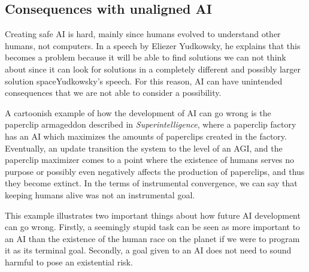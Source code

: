 \documentclass[12pt,A4]{report}
\newcommand{\autobaj}{}
\theoremstyle{definition}
\begin{document}


\subsection{Consequences with unaligned AI}
Creating safe AI is hard, mainly since humans evolved to understand other humans, not computers. In a speech by Eliezer Yudkowsky, he explains that this becomes a problem because it will be able to find solutions we can not think about since it can look for solutions in a completely different and possibly larger solution space\autobaj{Yudkowsky's speech}. For this reason, AI can have unintended consequences that we are not able to consider a possibility. 

A cartoonish example of how the development of AI can go wrong is the paperclip armageddon described in \textit{Superintelligence}, where a paperclip factory has an AI which maximizes the amounts of paperclips created in the factory. Eventually, an update transition the system to the level of an AGI, and the paperclip maximizer comes to a point where the existence of humans serves no purpose or possibly even negatively affects the production of paperclips, and thus they become extinct. In the terms of instrumental convergence, we can say that keeping humans alive was not an instrumental goal. 

This example illustrates two important things about how future AI development can go wrong. Firstly, a seemingly stupid task can be seen as more important to an AI than the existence of the human race on the planet if we were to program it as its terminal goal. Secondly, a goal given to an AI does not need to sound harmful to pose an existential risk. 
\end{document}

